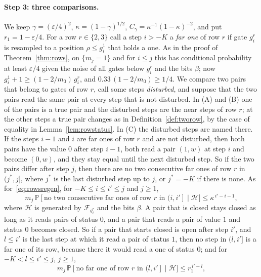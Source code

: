 \documentclass[11pt]{amsart}
\theoremstyle{definition}
\theoremstyle{remark}
\newcommand{\eps}{\varepsilon}
\newcommand{\PP}{\mathbb{P}}
\newcommand{\cF}{\mathcal{F}}
\begin{document}
\paragraph{Step 3: three comparisons.}
We keep $\gamma=(\eps/4)^2$, $\kappa=(1-\gamma)^{1/2}$, $C_\gamma=\kappa^{-1}(1-\kappa)^{-2}$, and
put $r_1=1-\eps/4$. For a row $r\in\{2,3\}$ call a step $i>-K$ a \emph{far one} of row $r$ if
gate $g^r_i$ is resampled to a position $\rho\le g^1_i$ that holds a one. As in the proof of
Theorem~\ref{thm:rows}, on $\{m_j=1\}$ and for $i\le j$ this has conditional probability at least
$\eps/4$ given the noise of all gates below $g^r_i$ and the bits $\beta$; now
$g^1_i+1\ge(1-2/m_0)\,g^r_i$, and $0.33\,(1-2/m_0)\ge1/4$. We compare two pairs that belong to gates of row $r$, call some steps
\emph{disturbed}, and suppose that the two pairs read the same pair at every step that is not
disturbed. In (A) and (B) one of the pairs is a true pair and the disturbed steps are the near
steps of row $r$; at the other steps a true pair changes as in Definition~\ref{def:tworow}, by
the case of equality in Lemma~\ref{lem:rowstatus}. In (C) the disturbed steps are named there. If the
steps $i-1$ and $i$ are far ones of row $r$ and are not disturbed, then both pairs have the value
$0$ after step $i-1$, both read a pair $(1,w)$ at step $i$ and become $(0,w)$, and they stay equal
until the next disturbed step. So if the two pairs differ after step $j$, then there are no two
consecutive far ones of row $r$ in $(j^*,j]$, where $j^*$ is the last disturbed step up to $j$,
or $j^*=-K$ if there is none. As for~\eqref{eq:rowsregen}, for $-K\le i\le i'\le j$ and $j\ge1$,
\begin{equation}\label{eq:rows3regen}
m_j\,\PP[\text{no two consecutive far ones of row }r\text{ in }(i,i']\mid\mathcal H]\le\kappa^{\,i'-i-1},
\end{equation}
where $\mathcal H$ is generated by $\cF_{g^r_i}$ and the bits $\beta$. A pair that is closed stays
closed as long as it reads pairs of status $0$, and a pair that reads a pair of value $1$ and
status $0$ becomes closed. So if a pair that starts closed is open after step $i'$, and $l\le i'$ is the last step
at which it read a pair of status $1$, then no step in $(l,i']$ is a far one of its row, because
there it would read a one of status $0$; and for $-K<l\le i'\le j$, $j\ge1$,
\begin{equation}\label{eq:rows3alive}
m_j\,\PP[\text{no far one of row }r\text{ in }(l,i']\mid\mathcal H]\le r_1^{\,i'-l},
\end{equation}
\end{document}
